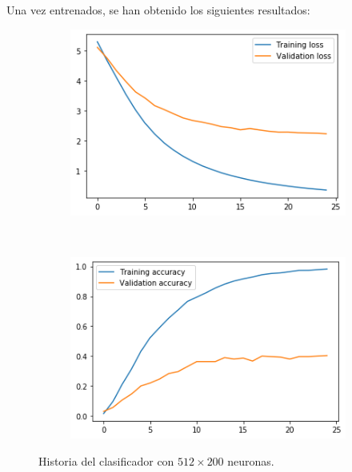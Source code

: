 \documentclass[11pt,a4paper]{article}
\begin{document}
Una vez entrenados, se han obtenido los siguientes resultados:

\begin{figure}[H]
  \centering
  \begin{subfigure}{.5\textwidth}
    \centering
    \includegraphics[scale=0.4]{img/feat-m2-loss.png}
    \label{fig:feat-m2-loss}
  \end{subfigure}%
  ~ \quad
  \begin{subfigure}{.5\textwidth}
    \centering
    \includegraphics[scale=0.4]{img/feat-m2-acc.png}
    \label{fig:feat-m2-acc}
  \end{subfigure}
  \caption{Historia del clasificador con $512 \times 200$ neuronas.}
  \label{fig:history-feat-m2}
\end{figure}
\end{document}
